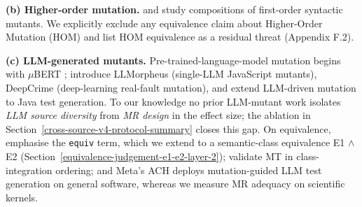 \documentclass[manuscript,screen,review]{acmart}
\begin{document}
\textbf{(b) Higher-order mutation.} \citet{jia2009hom} and \citet{kintis2018effective}
study compositions of first-order syntactic mutants. We
explicitly exclude any equivalence claim about Higher-Order Mutation
(HOM) and list HOM equivalence as a residual threat (Appendix F.2).

\textbf{(c) LLM-generated mutants.} Pre-trained-language-model mutation begins
with $\mu$BERT \citep{degiovanni2022mubert}; \citet{tip2025llmorpheus} introduce
LLMorpheus (single-LLM JavaScript mutants), \citet{humbatova2021deepcrime}
DeepCrime (deep-learning real-fault mutation), and \citet{dakhel2024llm} extend
LLM-driven mutation to Java test generation. To our knowledge no prior LLM-mutant
work isolates \emph{LLM source diversity} from \emph{MR design} in the effect
size; the ablation in Section~\ref{cross-source-v4-protocol-summary} closes this
gap. On equivalence, \citet{delgadoperez2020equivalent} emphasise the
\texttt{equiv} term, which we extend to a semantic-class equivalence
E1 $\wedge$ E2 (Section~\ref{equivalence-judgement-e1-e2-layer-2});
\citet{zhang2021classintegration} validate MT in class-integration ordering; and
Meta's ACH \citep{foster2025ach} deploys mutation-guided LLM test generation on
general software, whereas we measure MR adequacy on scientific kernels.
\end{document}
